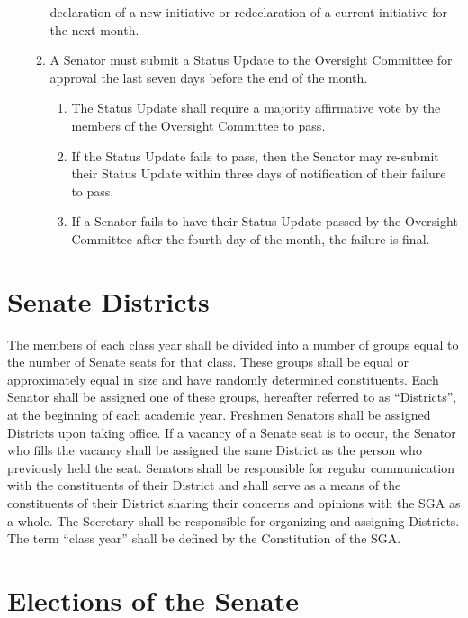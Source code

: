 \documentclass[12pt]{scrreprt}
\begin{document}
\begin{enumerate}
\begin{enumerate}
\begin{enumerate}
            \itemA declaration of a new initiative or redeclaration of a current initiative for the next month.
        \end{enumerate}
        \item A Senator must submit a Status Update to the Oversight Committee for approval the last seven days before the end of the month.
        \begin{enumerate}
            \item The Status Update shall require a majority affirmative vote by the members of the Oversight Committee to pass.
            \item If the Status Update fails to pass, then the Senator may re-submit their Status Update within three days of notification of their failure to pass.
            \item If a Senator fails to have their Status Update passed by the Oversight Committee after the fourth day of the month, the failure is final.
        \end{enumerate}
    \end{enumerate}
\end{enumerate}

\section{Senate Districts}
The members of each class year shall be divided into a number of groups equal to the number of Senate seats for that class. These groups shall be equal or approximately equal in size and have randomly determined constituents. Each Senator shall be assigned one of these groups, hereafter referred to as “Districts”, at the beginning of each academic year. Freshmen Senators shall be assigned Districts upon taking office. If a vacancy of a Senate seat is to occur, the Senator who fills the vacancy shall be assigned the same District as the person who previously held the seat. Senators shall be responsible for regular communication with the constituents of their District and shall serve as a means of the constituents of their District sharing their concerns and opinions with the SGA as a whole. The Secretary shall be responsible for organizing and assigning Districts. The term “class year” shall be defined by the Constitution of the SGA.

\section{Elections of the Senate}
\end{document}
